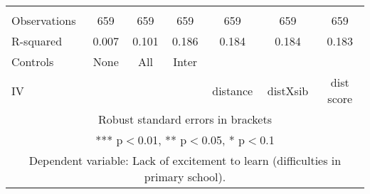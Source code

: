 \begin{tabular}{lcccccc}
 &  &  &  &  &  &  \\
Observations & 659 & 659 & 659 & 659 & 659 & 659 \\
R-squared & 0.007 & 0.101 & 0.186 & 0.184 & 0.184 & 0.183 \\
Controls & None & All & Inter &  &  &  \\
 IV &  &  &  & distance & distXsib & dist score \\ \hline
\multicolumn{7}{c}{ Robust standard errors in brackets} \\
\multicolumn{7}{c}{ *** p$<$0.01, ** p$<$0.05, * p$<$0.1} \\
\multicolumn{7}{c}{ Dependent variable: Lack of excitement to learn (difficulties in primary school).} \\
\end{tabular}
